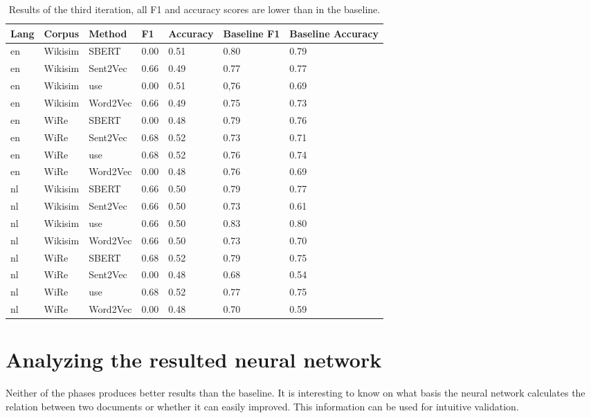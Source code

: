 {  \begin{table}[!ht]
    \centering
    \captionsetup{justification=centering}
    \begin{tabular}{l|l|l|l|l|l|l}
    \hline
        \textbf{Lang} & \textbf{Corpus} & \textbf{Method} &  \textbf{F1} & \textbf{Accuracy} & \textbf{Baseline F1} & \textbf{Baseline Accuracy} \\ \hline
en & Wikisim & SBERT & 0.00 & 0.51 & 0.80 & 0.79 \\ \hline
en & Wikisim & Sent2Vec & 0.66 & 0.49 & 0.77 & 0.77 \\ \hline
en & Wikisim & use & 0.00 & 0.51 & 0,76 & 0.69 \\ \hline
en & Wikisim & Word2Vec &  0.66 & 0.49 & 0.75 & 0.73 \\ \hline
en & WiRe & SBERT & 0.00 & 0.48 & 0.79 & 0.76 \\ \hline
en & WiRe & Sent2Vec & 0.68 & 0.52 & 0.73 & 0.71 \\ \hline
en & WiRe & use & 0.68 & 0.52 & 0.76 & 0.74 \\ \hline
en & WiRe & Word2Vec & 0.00 & 0.48 & 0.76 & 0.69 \\ \hline
nl & Wikisim & SBERT & 0.66 & 0.50 & 0.79 & 0.77 \\ \hline
nl & Wikisim & Sent2Vec & 0.66 & 0.50 & 0.73 & 0.61 \\ \hline
nl & Wikisim & use & 0.66 & 0.50 & 0.83 & 0.80 \\ \hline
nl & Wikisim & Word2Vec & 0.66 & 0.50 & 0.73 & 0.70 \\ \hline
nl & WiRe & SBERT & 0.68 & 0.52 & 0.79 & 0.75 \\ \hline
nl & WiRe & Sent2Vec & 0.00 & 0.48 & 0.68 & 0.54 \\ \hline
nl & WiRe & use & 0.68 & 0.52 & 0.77 & 0.75 \\ \hline
nl & WiRe & Word2Vec & 0.00 & 0.48 & 0.70 & 0.59 \\ \hline
\end{tabular}
    \caption{Results of the third iteration, all F1 and accuracy scores are lower than in the baseline.}
    \label{tabThridIteration}
\end{table}

 \section{Analyzing the resulted neural network}
 \label{secResultingNeuralNetwork}

Neither of the phases produces better results than the baseline. It is interesting to know on what basis the neural network calculates the relation between two documents or whether it can easily improved. This information can be used for intuitive validation.\\

}
